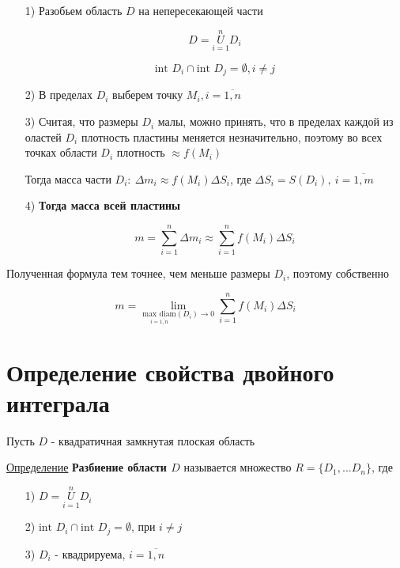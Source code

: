 \documentclass[a4paper, 14pt]{report}
\begin{document}
	\begin{enumerate}
		\item[1)] Разобьем область $D$ на непересекающей части
		
		$$ D = \overset{n}{\underset{i=1}{U}} D_i $$
		
		$$ \text{int } D_i \cap \text{int } D_j = \emptyset, i \ne j $$
		
		\item[2)] В пределах $D_i$ выберем точку $M_i, i = \overline{1,n}$
		\item[3)] Считая, что размеры $D_i$ малы, можно принять, что в пределах каждой из оластей $D_i$ плотность пластины меняется незначительно, поэтому во всех точках области $D_i$ плотность $\approx f(M_i)$ 
	
		Тогда масса части $D_i:\ \Delta m_i \approx f(M_i) \Delta S_i$, где $\Delta S_i = S(D_i),\ i = \overline{1, m}$
	
		\item[4)] \textbf{Тогда масса всей пластины}
		
		$$ m = \sum_{i=1}^n \Delta m_i \approx \sum_{i=1}^n f(M_i) \Delta S_i $$
	
	\end{enumerate}
	
	Полученная формула тем точнее, чем меньше размеры $D_i$, поэтому собственно
	
	$$ m = \lim_{\underset{i = \overline{1,n}}{\text{max diam}} (D_i) \to 0} \sum_{i=1}^n f(M_i) \Delta S_i $$
	
	\section{Определение свойства двойного интеграла}
	
	Пусть $D$ - квадратичная замкнутая плоская область
	
	\hfill
	
	\underline{Определение} \textbf{Разбиение области $D$} называется множество $R = \{ D_1, ... D_n\}$, где 
	
	\begin{enumerate}
		\item[1)] $D = \underset{i=1}{\overset{n}{U}} D_i$
		\item[2)] $\text{int } D_i \cap \text{int } D_j = \emptyset$, при $i \ne j$
		\item[3)] $D_i$ - квадрируема, $i = \overline{1,n}$
	\end{enumerate}
	
\end{document}
